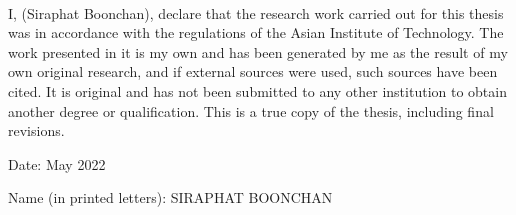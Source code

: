 
\setlength{\parindent}{0in}
\setlength{\parskip}{1em}
\setlength{\baselineskip}{1.6em}

\begin{center}
  \fontsize{14}{17} \\
\end{center}
\vspace{36pt}

I, (Siraphat Boonchan), declare that the research work carried out for this thesis was in accordance with the regulations of the Asian Institute of Technology. The work presented in it is my own and has been generated by me as the result of my own original research, and if external sources were used, such sources have been cited. It is original and has not been submitted to any other institution to obtain another degree or qualification. This is a true copy of the thesis, including final revisions.

Date: May 2022

Name (in printed letters): SIRAPHAT BOONCHAN
